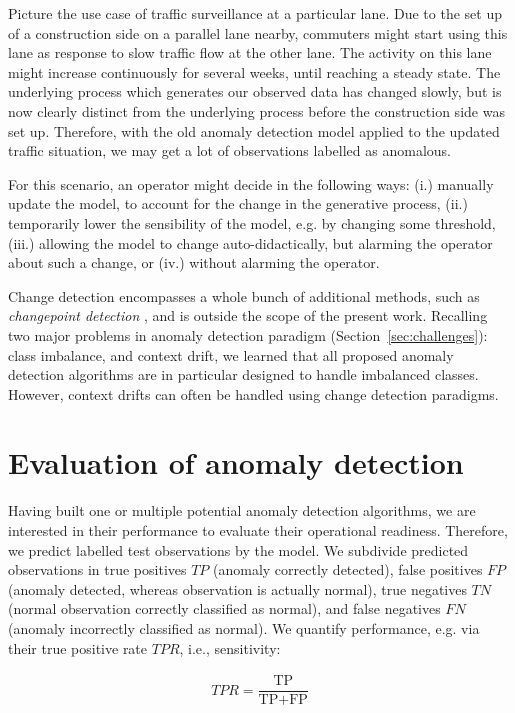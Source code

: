 \documentclass[conference]{IEEEtran}
\begin{document}
Picture the use case of traffic surveillance at a particular lane. Due to the set up of a construction side on a parallel lane nearby, commuters might start using this lane as response to slow traffic flow at the other lane. The activity on this lane might increase continuously for several weeks, until reaching a steady state. The underlying process which generates our observed data has changed slowly, but is now clearly distinct from the underlying process before the construction side was set up. Therefore, with the old anomaly detection model applied to the updated traffic situation, we may get a lot of observations labelled as anomalous. 

For this scenario, an operator might decide in the following ways: (i.) manually update the model, to account for the change in the generative process, (ii.) temporarily lower the sensibility of the model, e.g. by changing some threshold, (iii.) allowing the model to change auto-didactically, but alarming the operator about such a change, or (iv.) without alarming the operator.

Change detection encompasses a whole bunch of additional methods, such as \emph{changepoint detection} \cite{tartakovsky2012efficient}, and is outside the scope of the present work.
Recalling two major problems in anomaly detection paradigm (Section~\ref{sec:challenges}): class imbalance, and context drift, we learned that all proposed anomaly detection algorithms are in particular designed to handle imbalanced classes. However, context drifts can often be handled using change detection paradigms.  

\section{Evaluation of anomaly detection} \label{sec:eval}

Having built one or multiple potential anomaly detection algorithms, we are interested in their performance to evaluate their operational readiness. Therefore, we predict labelled test observations by the model. We subdivide predicted observations in true positives $TP$ (anomaly correctly detected), false positives $FP$ (anomaly detected, whereas observation is actually normal), true negatives $TN$ (normal observation correctly classified as normal), and false negatives $FN$ (anomaly incorrectly classified as normal).  We quantify performance, e.g. via their true positive rate $TPR$, i.e., sensitivity:

\begin{eqnarray} \label{eq:tpr}
    TPR = \dfrac{ \text{TP} }{ \text{TP}+\text{FP} }
\end{eqnarray}
\end{document}
